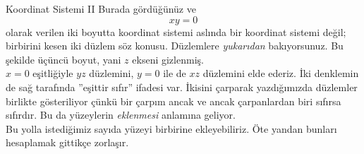 \begin{surferPage}[Koordinatlar II]{Koordinat Sistemi II}
Burada gördüğünüz ve
\[xy=0\]
olarak verilen iki boyutta koordinat sistemi aslında bir koordinat sistemi değil; birbirini kesen iki düzlem söz konusu. Düzlemlere {\it yukarıdan} bakıyorsunuz. Bu şekilde üçüncü boyut, yani $z$ ekseni gizlenmiş. \\
\vspace{0.3cm}
$x=0$ eşitliğiyle  $yz$ düzlemini,   $y=0$ ile de  $xz$ düzlemini elde ederiz.
İki denklemin de sağ tarafında ''eşittir sıfır'' ifadesi var. İkisini çarparak yazdığımızda
düzlemler birlikte gösteriliyor çünkü bir çarpım ancak ve ancak çarpanlardan biri sıfırsa sıfırdır. 
Bu da yüzeylerin {\it eklenmesi} anlamına geliyor. \\
Bu yolla istediğimiz sayıda yüzeyi birbirine ekleyebiliriz. Öte yandan bunları hesaplamak gittikçe zorlaşır.
\end{surferPage}
